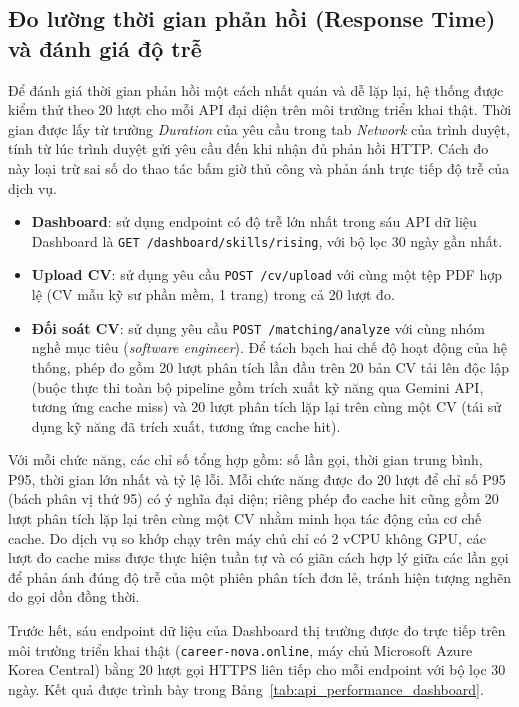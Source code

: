 \subsection{Đo lường thời gian phản hồi (Response Time) và đánh giá độ trễ}

Để đánh giá thời gian phản hồi một cách nhất quán và dễ lặp lại, hệ thống được kiểm thử theo 20 lượt cho mỗi API đại diện trên môi trường triển khai thật. Thời gian được lấy từ trường \textit{Duration} của yêu cầu trong tab \textit{Network} của trình duyệt, tính từ lúc trình duyệt gửi yêu cầu đến khi nhận đủ phản hồi HTTP. Cách đo này loại trừ sai số do thao tác bấm giờ thủ công và phản ánh trực tiếp độ trễ của dịch vụ.

\begin{itemize}
    \item \textbf{Dashboard}: sử dụng endpoint có độ trễ lớn nhất trong sáu API dữ liệu Dashboard là \texttt{GET /dashboard/skills/rising}, với bộ lọc 30 ngày gần nhất.
    \item \textbf{Upload CV}: sử dụng yêu cầu \texttt{POST /cv/upload} với cùng một tệp PDF hợp lệ (CV mẫu kỹ sư phần mềm, 1 trang) trong cả 20 lượt đo.
    \item \textbf{Đối soát CV}: sử dụng yêu cầu \texttt{POST /matching/analyze} với cùng nhóm nghề mục tiêu (\textit{software engineer}). Để tách bạch hai chế độ hoạt động của hệ thống, phép đo gồm 20 lượt phân tích lần đầu trên 20 bản CV tải lên độc lập (buộc thực thi toàn bộ pipeline gồm trích xuất kỹ năng qua Gemini API, tương ứng cache miss) và 20 lượt phân tích lặp lại trên cùng một CV (tái sử dụng kỹ năng đã trích xuất, tương ứng cache hit).
\end{itemize}

Với mỗi chức năng, các chỉ số tổng hợp gồm: số lần gọi, thời gian trung bình, P95, thời gian lớn nhất và tỷ lệ lỗi. Mỗi chức năng được đo 20 lượt để chỉ số P95 (bách phân vị thứ 95) có ý nghĩa đại diện; riêng phép đo cache hit cũng gồm 20 lượt phân tích lặp lại trên cùng một CV nhằm minh họa tác động của cơ chế cache. Do dịch vụ so khớp chạy trên máy chủ chỉ có 2 vCPU không GPU, các lượt đo cache miss được thực hiện tuần tự và có giãn cách hợp lý giữa các lần gọi để phản ánh đúng độ trễ của một phiên phân tích đơn lẻ, tránh hiện tượng nghẽn do gọi dồn đồng thời.

Trước hết, sáu endpoint dữ liệu của Dashboard thị trường được đo trực tiếp trên môi trường triển khai thật (\texttt{career-nova.online}, máy chủ Microsoft Azure Korea Central) bằng 20 lượt gọi HTTPS liên tiếp cho mỗi endpoint với bộ lọc 30 ngày. Kết quả được trình bày trong Bảng~\ref{tab:api_performance_dashboard}.

